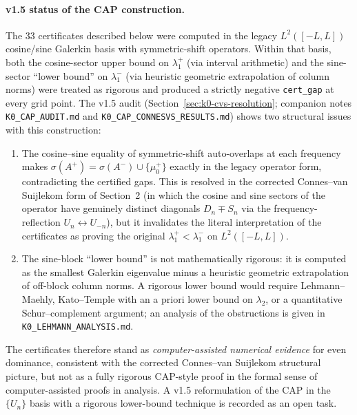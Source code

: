 \documentclass[11pt,a4paper]{article}
\theoremstyle{remark}
\theoremstyle{plain}
\begin{document}
\paragraph{v1.5 status of the CAP construction.}  The 33 certificates
described below were computed in the legacy $L^2([-L,L])$ cosine/sine
Galerkin basis with symmetric-shift operators.  Within that basis,
both the cosine-sector upper bound on $\lambda_1^+$ (via interval
arithmetic) and the sine-sector ``lower bound'' on $\lambda_1^-$ (via
heuristic geometric extrapolation of column norms) were treated as
rigorous and produced a strictly negative \texttt{cert\_gap} at every
grid point.  The v1.5 audit (Section~\ref{sec:k0-cvs-resolution};
companion notes \texttt{K0\_CAP\_AUDIT.md} and
\texttt{K0\_CAP\_CONNESVS\_RESULTS.md}) shows two structural issues
with this construction:
\begin{enumerate}[label=(\arabic*),leftmargin=*]
  \item The cosine--sine equality of symmetric-shift auto-overlaps at
    each frequency makes $\sigma(A^+) = \sigma(A^-) \cup \{\mu^+_0\}$
    exactly in the legacy operator form, contradicting the certified
    gaps.  This is resolved in the corrected Connes--van Suijlekom
    form of Section~2 (in which the cosine and sine sectors of the
    operator have genuinely distinct diagonals $D_n\mp S_n$ via the
    frequency-reflection $U_n\leftrightarrow U_{-n}$), but it
    invalidates the literal interpretation of the certificates as
    proving the original $\lambda_1^+ < \lambda_1^-$ on $L^2([-L,L])$.
  \item The sine-block ``lower bound'' is not mathematically
    rigorous: it is computed as the smallest Galerkin eigenvalue minus
    a heuristic geometric extrapolation of off-block column norms.
    A rigorous lower bound would require Lehmann--Maehly,
    Kato--Temple with an a priori lower bound on $\lambda_2$, or a
    quantitative Schur--complement argument; an analysis of the
    obstructions is given in \texttt{K0\_LEHMANN\_ANALYSIS.md}.
\end{enumerate}
The certificates therefore stand as \emph{computer-assisted numerical
evidence} for even dominance, consistent with the corrected
Connes--van Suijlekom structural picture, but not as a fully rigorous
CAP-style proof in the formal sense of computer-assisted proofs in
analysis.  A v1.5 reformulation of the CAP in the $\{U_n\}$ basis with
a rigorous lower-bound technique is recorded as an open task.

\bigskip
\end{document}

